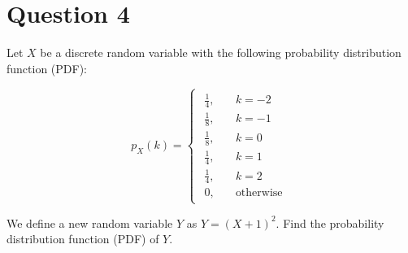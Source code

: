 \documentclass[12pt]{article}
\begin{document}
	
	\section*{Question 4}
	
	\noindent Let $X$ be a discrete random variable with the following probability distribution function (PDF):
	
	\[
		p_X(k) =
		\begin{cases}
			\begin{aligned}
				\frac{1}{4}, &\quad k = -2\\
				\frac{1}{8}, &\quad k = -1\\
				\frac{1}{8}, &\quad k = 0\\
				\frac{1}{4}, &\quad k = 1\\
				\frac{1}{4}, &\quad k = 2\\
				0, &\quad \text{otherwise}
			\end{aligned}
		\end{cases}
	\]
	
	\noindent We define a new random variable $Y$ as $Y = (X + 1)^2$. Find the probability distribution function (PDF) of $Y$.
	
	\bigskip
	
\end{document}
